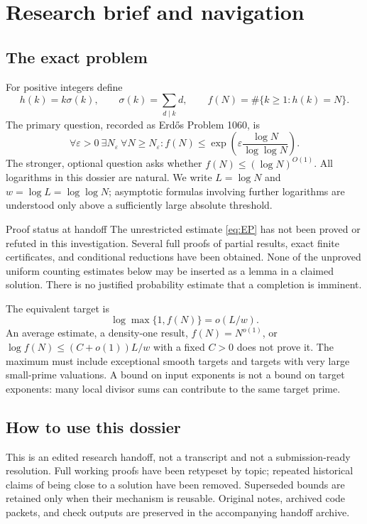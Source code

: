 \chapter{Research brief and navigation}\label{ch:orientation}
\section{The exact problem}
For positive integers define
\[
 h(k)=k\sigma(k),\qquad \sigma(k)=\sum_{d\mid k}d,\qquad
 f(N)=\#\{k\ge1:h(k)=N\}.
\]
The primary question, recorded as Erd\H{o}s Problem 1060, is
\begin{equation}\label{eq:EP}
 \boxed{\forall\varepsilon>0\ \exists N_\varepsilon\ \forall N\ge N_\varepsilon:
 f(N)\le\exp\!\left(\varepsilon\frac{\log N}{\log\log N}\right).}
\end{equation}
The stronger, optional question asks whether $f(N)\le(\log N)^{O(1)}$.
All logarithms in this dossier are natural. We write $L=\log N$ and
$w=\log L=\log\log N$; asymptotic formulas involving further logarithms are
understood only above a sufficiently large absolute threshold.

\begin{statusbox}{Proof status at handoff}
The unrestricted estimate \eqref{eq:EP} has not been proved or refuted in this
investigation. Several full proofs of partial results, exact finite certificates,
and conditional reductions have been obtained. None of the unproved uniform
counting estimates below may be inserted as a lemma in a claimed solution.
There is no justified probability estimate that a completion is imminent.
\end{statusbox}

The equivalent target is
\[
 \log\max\{1,f(N)\}=o(L/w).
\]
An average estimate, a density-one result, $f(N)=N^{o(1)}$, or
$\log f(N)\le(C+o(1))L/w$ with a fixed $C>0$ does not prove it.
The maximum must include exceptional smooth targets and targets with very large
small-prime valuations. A bound on input exponents is not a bound on target
exponents: many local divisor sums can contribute to the same target prime.

\section{How to use this dossier}
This is an edited research handoff, not a transcript and not a submission-ready
resolution. Full working proofs have been retypeset by topic; repeated historical
claims of being close to a solution have been removed. Superseded bounds are
retained only when their mechanism is reusable. Original notes, archived code
packets, and check outputs are preserved in the accompanying handoff archive.

